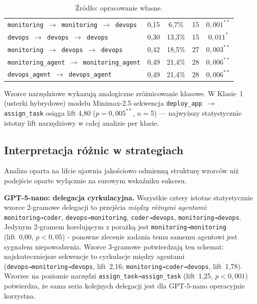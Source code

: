\begin{table}[H]
\begin{tabular}{p{}cccc}
        \texttt{monitoring $\to$ monitoring $\to$ devops}                & 0,15 & 6,7\%  & 15 & $0{,}001^{**}$ \\
        \texttt{devops $\to$ devops $\to$ devops}                        & 0,30 & 13,3\% & 15 & $0{,}011^{*}$ \\
        \texttt{monitoring $\to$ devops $\to$ devops}                    & 0,42 & 18,5\% & 27 & $0{,}003^{**}$ \\
        \texttt{monitoring\_agent $\to$ monitoring\_agent}               & 0,49 & 21,4\% & 28 & $0{,}006^{**}$ \\
        \texttt{devops\_agent $\to$ devops\_agent}                       & 0,49 & 21,4\% & 28 & $0{,}006^{**}$ \\
        \hline
    \end{tabular}
    \caption*{\footnotesize Źródło: opracowanie własne.}
\end{table}

Wzorce narzędziowe wykazują analogiczne zróżnicowanie klasowe. W Klasie~1 (usterki hybrydowe) modelu Minimax-2.5 sekwencja \texttt{deploy\_app $\to$ assign\_task} osiąga lift 4,80 ($p=0{,}005^{**}$, $n=5$) --- najwyższy statystycznie istotny lift narzędziowy w całej analizie per klasie.

\subsection{Interpretacja różnic w strategiach}
\label{subsec:interpretacja}

Analiza oparta na lifcie ujawnia jakościowo odmienną strukturę wzorców niż podejście oparte wyłącznie na surowym wskaźniku sukcesu.

\textbf{GPT-5-nano: delegacja cyrkulacyjna.} Wszystkie cztery istotne statystycznie wzorce 2-gramowe delegacji to przejścia \emph{między różnymi agentami}: \texttt{monitoring→coder}, \texttt{devops→monitoring}, \texttt{coder→devops}, \texttt{monitoring→devops}. Jedynym 2-gramem korelującym z porażką jest \texttt{monitoring→monitoring} (lift~0,00, $p < 0{,}05$) - ponowne zlecenie zadania temu samemu agentowi jest sygnałem niepowodzenia. Wzorce 3-gramowe potwierdzają ten schemat: najskuteczniejsze sekwencje to cyrkulacje między agentami (\texttt{devops→monitoring→devops}, lift~2,16; \texttt{monitoring→coder→devops}, lift~1,78). Wzorzec na poziomie narzędzi \texttt{assign\_task→assign\_task} (lift~1,25, $p < 0{,}001$) potwierdza, że sama seria kolejnych delegacji jest dla GPT-5-nano operacyjnie korzystna.

